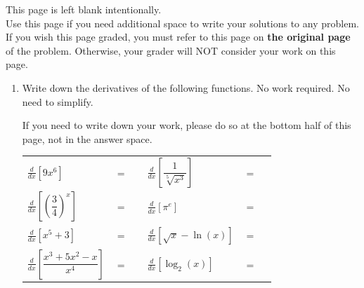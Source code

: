 \documentclass[11pt]{article}
\begin{document}
\vfill


\newpage

This page is left blank intentionally.\\

Use this page if you need additional space to write your solutions to any problem. \\

If you wish this page graded, you must refer to this page on \textbf{the original page} of the problem. Otherwise, your grader will NOT consider your work on this page.

\newpage%


\begin{enumerate}



\item Write down the derivatives of the following functions. No work required. No need to simplify.

If you need to write down your work, please do so at the bottom half of this page, not in the answer space.

\begin{center}
        \begin{tabular}{l c r l c r}
            $\displaystyle\frac{d}{dx}\left[ 9x^{6} \right]$ & $=$ & \rule[-8pt]{1.5in}{0.4pt} &
            $\displaystyle\frac{d}{dx}\left[ \dfrac{1}{\sqrt[5]{x^3}} \right]$ & $=$ & \rule[-8pt]{1.5in}{0.4pt}\\[0.3in]
            $\displaystyle\frac{d}{dx}\left[ \left(\dfrac{3}{4}\right)^x \right]$ & $=$ & \rule[-8pt]{1.5in}{0.4pt} & 
            $\displaystyle\frac{d}{dx}\left[ \pi^{e} \right]$ & $=$ & \rule[-8pt]{1.5in}{0.4pt}\\[0.3in]
            $\displaystyle\frac{d}{dx}\left[ x^5+3 \right]$ & $=$ & \rule[-8pt]{1.5in}{0.4pt}&
            $\displaystyle\frac{d}{dx}\left[ \sqrt{x}-\ln(x) \right]$ & $=$ & \rule[-8pt]{1.5in}{0.4pt}\\[0.3in]
            $\displaystyle\frac{d}{dx}\left[ \dfrac{x^3+5x^2-x}{x^4} \right]$ & $=$ & \rule[-8pt]{1.5in}{0.4pt} & 
            $\displaystyle\frac{d}{dx}\left[ \log_{2}(x) \right]$ & $=$ & \rule[-8pt]{1.5in}{0.4pt}\\[0.3in]
        \end{tabular}
        

\end{center}
\end{enumerate}
\end{document}
